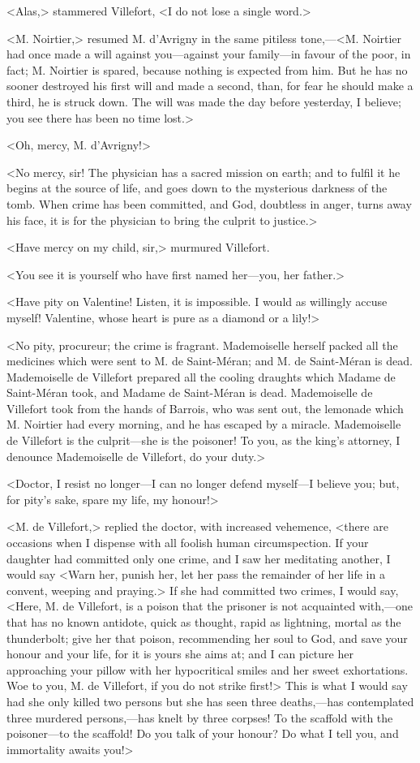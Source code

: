  <Alas,> stammered Villefort, <I do not lose a single word.> 

 <M. Noirtier,> resumed M. d'Avrigny in the same pitiless tone,—<M. Noirtier had once made a will against you—against your family—in favour of the poor, in fact; M. Noirtier is spared, because nothing is expected from him. But he has no sooner destroyed his first will and made a second, than, for fear he should make a third, he is struck down. The will was made the day before yesterday, I believe; you see there has been no time lost.> 

 <Oh, mercy, M. d'Avrigny!> 

 <No mercy, sir! The physician has a sacred mission on earth; and to fulfil it he begins at the source of life, and goes down to the mysterious darkness of the tomb. When crime has been committed, and God, doubtless in anger, turns away his face, it is for the physician to bring the culprit to justice.>

<Have mercy on my child, sir,> murmured Villefort. 

 <You see it is yourself who have first named her—you, her father.> 

 <Have pity on Valentine! Listen, it is impossible. I would as willingly accuse myself! Valentine, whose heart is pure as a diamond or a lily!> 

 <No pity, procureur; the crime is fragrant. Mademoiselle herself packed all the medicines which were sent to M. de Saint-Méran; and M. de Saint-Méran is dead. Mademoiselle de Villefort prepared all the cooling draughts which Madame de Saint-Méran took, and Madame de Saint-Méran is dead. Mademoiselle de Villefort took from the hands of Barrois, who was sent out, the lemonade which M. Noirtier had every morning, and he has escaped by a miracle. Mademoiselle de Villefort is the culprit—she is the poisoner! To you, as the king's attorney, I denounce Mademoiselle de Villefort, do your duty.> 

 <Doctor, I resist no longer—I can no longer defend myself—I believe you; but, for pity's sake, spare my life, my honour!> 

 <M. de Villefort,> replied the doctor, with increased vehemence, <there are occasions when I dispense with all foolish human circumspection. If your daughter had committed only one crime, and I saw her meditating another, I would say <Warn her, punish her, let her pass the remainder of her life in a convent, weeping and praying.> If she had committed two crimes, I would say, <Here, M. de Villefort, is a poison that the prisoner is not acquainted with,—one that has no known antidote, quick as thought, rapid as lightning, mortal as the thunderbolt; give her that poison, recommending her soul to God, and save your honour and your life, for it is yours she aims at; and I can picture her approaching your pillow with her hypocritical smiles and her sweet exhortations. Woe to you, M. de Villefort, if you do not strike first!> This is what I would say had she only killed two persons but she has seen three deaths,—has contemplated three murdered persons,—has knelt by three corpses! To the scaffold with the poisoner—to the scaffold! Do you talk of your honour? Do what I tell you, and immortality awaits you!> 

